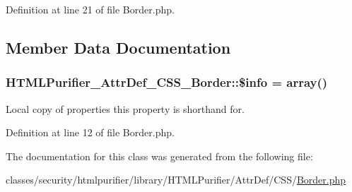 Definition at line 21 of file Border.\+php.



\subsection{Member Data Documentation}
\hypertarget{classHTMLPurifier__AttrDef__CSS__Border_aa9fb4d4dfd690be373acff02889c8096}{
\subsubsection[{\$info}]{\setlength{\rightskip}{0pt plus 5cm}H\+T\+M\+L\+Purifier\+\_\+\+Attr\+Def\+\_\+\+C\+S\+S\+\_\+\+Border\+::\$info = array()\hspace{0.3cm}{\ttfamily [protected]}}}\label{classHTMLPurifier__AttrDef__CSS__Border_aa9fb4d4dfd690be373acff02889c8096}
Local copy of properties this property is shorthand for. 

Definition at line 12 of file Border.\+php.



The documentation for this class was generated from the following file\+:\begin{DoxyCompactItemize}
\item 
classes/security/htmlpurifier/library/\+H\+T\+M\+L\+Purifier/\+Attr\+Def/\+C\+S\+S/\hyperlink{AttrDef_2CSS_2Border_8php}{Border.\+php}\end{DoxyCompactItemize}
